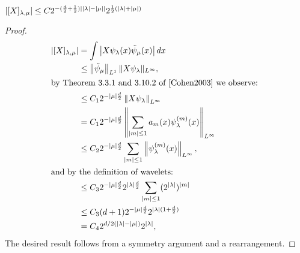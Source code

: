 \begin{lemma} \label{lem:matrix_bound}
	$\left| [X]_{\lambda,\mu} \right| \leq C 2^{-(\frac{d}{2}+\frac{1}{2})\left| \left| \lambda \right|-\left| \mu \right| \right|}2^{\frac{1}{2}(\left| \lambda \right|+\left| \mu \right|)}$
\end{lemma}
\begin{proof}
	\begin{align*}
		\abs{[X]_{\lambda,\mu}} 	&= \int \abs{X \psi_{\lambda}(x) \tilde{\psi}_{\mu}(x)} dx \\
								&\leq \norm{\tilde{\psi}_\mu}_{L^1} \| X \psi_\lambda \|_{L^\infty}, \\ %
							\intertext{by Theorem 3.3.1 and 3.10.2 of \cite{Cohen2003} we observe: }
								&\leq C_1 2^{-\card{\mu}\frac{d}{2}}\norm{X\psi_{\lambda}}_{L^{\infty}} \\
								&= C_1 2^{-\card{\mu}\frac{d}{2}}\norm{ \sum_{\abs{m} \leq 1 } a_m(x) \psi^{(m)}_\lambda(x) }_{L^{\infty}} \\
								&\leq C_2 2^{-\card{\mu}\frac{d}{2}}\sum_{\card{m}\leq 1}\norm{\psi_{\lambda}^{(m)}(x)}_{L^{\infty}} , \\
							\intertext{and by the definition of wavelets:}
								&\leq C_3 2^{-\card{\mu}\frac{d}{2}} 2^{\card{\lambda}\frac{d}{2}} \sum_{\card{m}\leq 1} (2^{\card{\lambda}})^{\abs{m}} \\
								&\leq C_3 (d+1) 2^{-\card{\mu}\frac{d}{2}} 2^{\card{\lambda}(1+\frac{d}{2})} \\
								&= C_4 2^{d/2(\card{\lambda} - \card{\mu})}2^{\card{\lambda}},
	\end{align*}
	The desired result follows from a symmetry argument and a rearrangement.
\end{proof}

